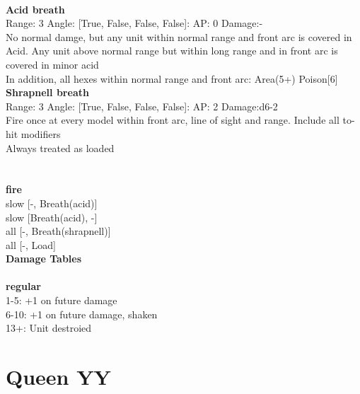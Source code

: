 \ \\
{\bf Acid breath } \\



Range: 3  Angle: [True, False, False, False]: AP: 0 Damage:- \\
No normal damge, but any unit within normal range and front arc is covered in Acid. Any unit above normal range but within long range and in front arc is covered in minor acid\\ 
In addition, all hexes within normal range and front arc: Area(5+) Poison[6]\\ 




{\bf Shrapnell breath } \\



Range: 3  Angle: [True, False, False, False]: AP: 2 Damage:d6-2 \\
Fire once at every model within front arc, line of sight and range. Include all to-hit modifiers\\ 
Always treated as loaded\\ 




 
\ \\



\ \\ {\bf fire } \\
slow [-, Breath(acid)] \\
slow [Breath(acid), -] \\
all [-, Breath(shrapnell)] \\
all [-, Load] \\


{\bf Damage Tables} \\
\ \\ {\bf regular } \\
1-5: +1 on future damage \\
6-10: +1 on future damage, shaken \\
13+: Unit destroied \\










\pagebreak\pagebreak

\section{ Queen YY }

